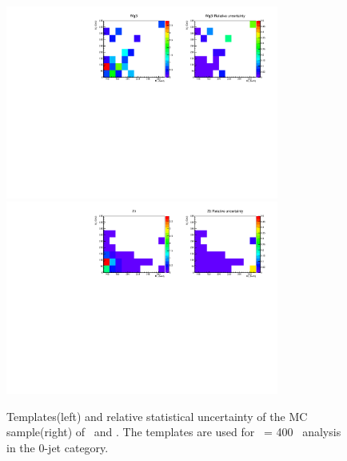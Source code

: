 \begin{figure}[htp]
\centering
\includegraphics[width=0.8\textwidth]{figures/2dtemplate_Wg3l_mH400_0j.pdf}
\includegraphics[width=0.8\textwidth]{figures/2dtemplate_Ztt_mH400_0j.pdf}
\caption{Templates(left) and relative statistical uncertainty of the MC sample(right) 
of \wgammastar\ and \ztt. 
The templates are used for \mHi\ = 400 \GeV\ analysis in the 0-jet category.}
\label{fig:2dtemplate_400_0j_4}
\end{figure} 



